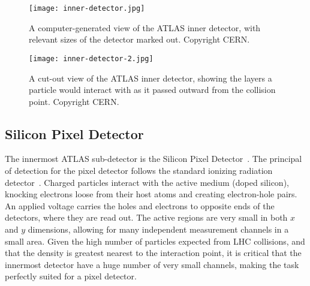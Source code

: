 
\begin{figure}
\centering
\texttt{[image: inner-detector.jpg]}
\label{fig:detector:inner-detector}
\caption{A computer-generated view of the ATLAS inner detector, with relevant sizes of the detector marked out. Copyright CERN.}
\end{figure}



\begin{figure}
\centering
\texttt{[image: inner-detector-2.jpg]}
\label{fig:detector:inner-detector-2}
\caption{A cut-out view of the ATLAS inner detector, showing the layers a particle would interact with as it passed outward from the collision point. Copyright CERN.}
\end{figure}


\subsection{Silicon Pixel Detector}

The innermost ATLAS sub-detector is the Silicon Pixel Detector~\cite{ATLASPaper}. The principal of detection for the pixel detector follows the standard ionizing radiation detector~\cite{Detectors}. Charged particles interact with the active medium (doped silicon), knocking electrons loose from their host atoms and creating electron-hole pairs. An applied voltage carries the holes and electrons to opposite ends of the detectors, where they are read out. The active regions are very small in both $x$ and $y$ dimensions, allowing for many independent measurement channels in a small area. Given the high number of particles expected from LHC collisions, and that the density is greatest nearest to the interaction point, it is critical that the innermost detector have a huge number of very small channels, making the task perfectly suited for a pixel detector.

